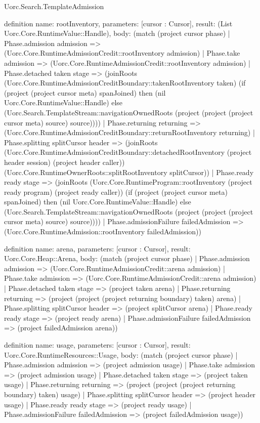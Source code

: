 \begin{lexlean}{Uorc.Search.TemplateAdmission}
\begin{semanticmodule}
definition{
  name: rootInventory,
  parameters: [cursor : Cursor],
  result: (List Uorc.Core.RuntimeValue::Handle),
  body: (match (project cursor phase)
    | Phase.admission admission => (Uorc.Core.RuntimeAdmissionCredit::rootInventory admission)
    | Phase.take admission => (Uorc.Core.RuntimeAdmissionCredit::rootInventory admission)
    | Phase.detached taken stage => (joinRoots (Uorc.Core.RuntimeAdmissionCreditBoundary::takenRootInventory taken) (if (project (project cursor meta) spanJoined) then (nil Uorc.Core.RuntimeValue::Handle) else (Uorc.Search.TemplateStream::navigationOwnedRoots (project (project (project cursor meta) source) source))))
    | Phase.returning returning => (Uorc.Core.RuntimeAdmissionCreditBoundary::returnRootInventory returning)
    | Phase.splitting splitCursor header => (joinRoots (Uorc.Core.RuntimeAdmissionCreditBoundary::detachedRootInventory (project header session) (project header caller)) (Uorc.Core.RuntimeOwnerRoots::splitRootInventory splitCursor))
    | Phase.ready ready stage => (joinRoots (Uorc.Core.RuntimeProgram::rootInventory (project ready program) (project ready caller)) (if (project (project cursor meta) spanJoined) then (nil Uorc.Core.RuntimeValue::Handle) else (Uorc.Search.TemplateStream::navigationOwnedRoots (project (project (project cursor meta) source) source))))
    | Phase.admissionFailure failedAdmission => (Uorc.Core.RuntimeAdmission::rootInventory failedAdmission))
}

definition{
  name: arena,
  parameters: [cursor : Cursor],
  result: Uorc.Core.Heap::Arena,
  body: (match (project cursor phase)
    | Phase.admission admission => (Uorc.Core.RuntimeAdmissionCredit::arena admission)
    | Phase.take admission => (Uorc.Core.RuntimeAdmissionCredit::arena admission)
    | Phase.detached taken stage => (project taken arena)
    | Phase.returning returning => (project (project (project returning boundary) taken) arena)
    | Phase.splitting splitCursor header => (project splitCursor arena)
    | Phase.ready ready stage => (project ready arena)
    | Phase.admissionFailure failedAdmission => (project failedAdmission arena))
}

definition{
  name: usage,
  parameters: [cursor : Cursor],
  result: Uorc.Core.RuntimeResources::Usage,
  body: (match (project cursor phase)
    | Phase.admission admission => (project admission usage)
    | Phase.take admission => (project admission usage)
    | Phase.detached taken stage => (project taken usage)
    | Phase.returning returning => (project (project (project returning boundary) taken) usage)
    | Phase.splitting splitCursor header => (project header usage)
    | Phase.ready ready stage => (project ready usage)
    | Phase.admissionFailure failedAdmission => (project failedAdmission usage))
}


\end{semanticmodule}
\end{lexlean}

